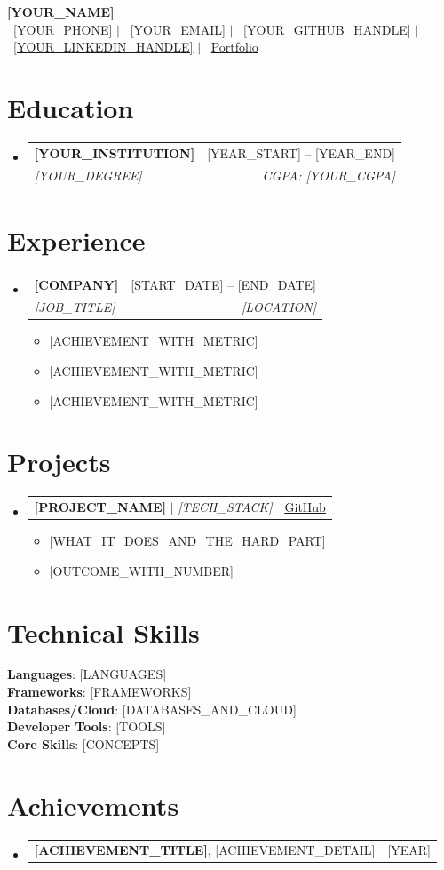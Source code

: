 \documentclass[a4paper,11pt]{article}
\makeatletter
\newcommand{\resumeItem}[1]{\item\small{{#1 \vspace{-2pt}}}}
\newcommand{\resumeSubheading}[4]{
  \vspace{-2pt}\item
    \begin{tabular*}{0.97\textwidth}[t]{l@{\extracolsep{\fill}}r}
      \textbf{#1} & #2 \\
      \textit{\small#3} & \textit{\small #4} \\
    \end{tabular*}\vspace{-7pt}
}
\newcommand{\resumeProjectHeading}[2]{
    \item
    \begin{tabular*}{0.97\textwidth}{l@{\extracolsep{\fill}}r}
      \small#1 & #2 \\
    \end{tabular*}\vspace{-7pt}
}
\newcommand{\resumeSubHeadingListStart}{\begin{itemize}[leftmargin=0.15in, label={}]}
\newcommand{\resumeSubHeadingListEnd}{\end{itemize}}
\newcommand{\resumeItemListStart}{\begin{itemize}}
\newcommand{\resumeItemListEnd}{\end{itemize}\vspace{-5pt}}
\makeatother
\begin{document}
\begin{center}
    \textbf{\Huge \scshape [YOUR_NAME]} \\ \vspace{1pt}
    \small \faPhone\ [YOUR_PHONE] $|$
    \faEnvelope\ \href{mailto:[YOUR_EMAIL]}{[YOUR_EMAIL]} $|$
    \faGithub\ \href{[YOUR_GITHUB_URL]}{[YOUR_GITHUB_HANDLE]} $|$
    \faLinkedin\ \href{[YOUR_LINKEDIN_URL]}{[YOUR_LINKEDIN_HANDLE]} $|$
    \faGlobe\ \href{[YOUR_PORTFOLIO_URL]}{Portfolio}
\end{center}

\section{Education}
  \resumeSubHeadingListStart
    \resumeSubheading
      {[YOUR_INSTITUTION]}{[YEAR_START] -- [YEAR_END]}
      {[YOUR_DEGREE]}{CGPA: [YOUR_CGPA]}
  \resumeSubHeadingListEnd

\section{Experience}
  \resumeSubHeadingListStart

    \resumeSubheading
      {[COMPANY]}{[START_DATE] -- [END_DATE]}
      {[JOB_TITLE]}{[LOCATION]}
      \resumeItemListStart
        \resumeItem{[ACHIEVEMENT_WITH_METRIC]}
        \resumeItem{[ACHIEVEMENT_WITH_METRIC]}
        \resumeItem{[ACHIEVEMENT_WITH_METRIC]}
      \resumeItemListEnd

  \resumeSubHeadingListEnd

\section{Projects}
    \resumeSubHeadingListStart
      \resumeProjectHeading
          {\textbf{[PROJECT_NAME]} $|$ \emph{[TECH_STACK]}}{\href{[PROJECT_URL]}{\underline{GitHub}}}
          \resumeItemListStart
            \resumeItem{[WHAT_IT_DOES_AND_THE_HARD_PART]}
            \resumeItem{[OUTCOME_WITH_NUMBER]}
          \resumeItemListEnd
    \resumeSubHeadingListEnd

\section{Technical Skills}
 \begin{itemize}[leftmargin=0.15in, label={}]
    \small{\item{
     \textbf{Languages}{: [LANGUAGES]} \\
     \textbf{Frameworks}{: [FRAMEWORKS]} \\
     \textbf{Databases/Cloud}{: [DATABASES_AND_CLOUD]} \\
     \textbf{Developer Tools}{: [TOOLS]} \\
     \textbf{Core Skills}{: [CONCEPTS]}
    }}
 \end{itemize}

\section{Achievements}
  \resumeSubHeadingListStart
    \resumeProjectHeading{\textbf{[ACHIEVEMENT_TITLE]}, [ACHIEVEMENT_DETAIL]}{[YEAR]}
  \resumeSubHeadingListEnd
\end{document}
